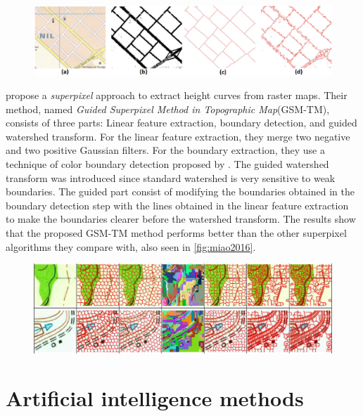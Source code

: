 \begin{figure}[H]
	\centering
	\includegraphics[width=0.9\linewidth]{fig/chiang2013.png}
	\label{fig:chiang2013}
\end{figure}

\citet{Miao2016} propose a \emph{superpixel}\cite{Ren2003} approach to extract height curves from raster maps. Their method, named \emph{Guided Superpixel Method in Topographic Map}(GSM-TM), consists of three parts: Linear feature extraction, boundary detection, and guided watershed transform. For the linear feature extraction, they merge two negative and two positive Gaussian filters. For the boundary extraction, they use a technique of color boundary detection proposed by \citet{Yang2013}. The guided watershed transform was introduced since standard watershed is very sensitive to weak boundaries. The guided part consist of modifying the boundaries obtained in the boundary detection step with the lines obtained in the linear feature extraction to make the boundaries clearer before the watershed transform. The results show that the proposed GSM-TM method performs better than the other superpixel algorithms they compare with, also seen in \autoref{fig:miao2016}. 

\begin{figure}[H]
	\centering
	\includegraphics[width=0.9\linewidth]{fig/miao2016.png}
	\label{fig:miao2016}
\end{figure}

\section{Artificial intelligence methods}

